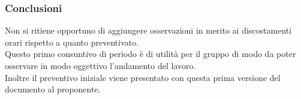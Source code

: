 	\subsubsection{Conclusioni}
	Non si ritiene opportuno di aggiungere osservazioni in merito ai discostamenti orari rispetto a quanto preventivato.\\
	Questo primo consuntivo di periodo è di utilità per il gruppo di modo da poter osservare in modo oggettivo l'andamento del lavoro.\\
	Inoltre il preventivo iniziale viene presentato con questa prima versione del documento al proponente.
	